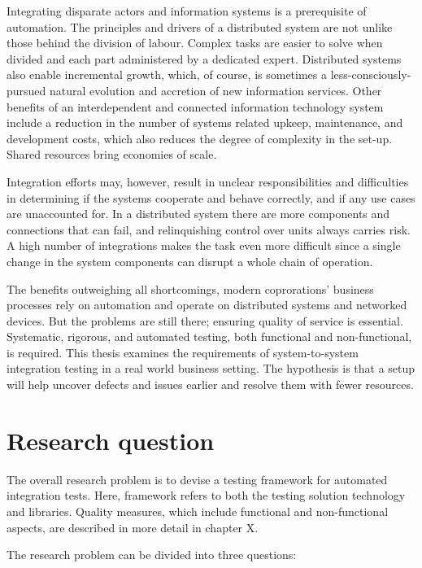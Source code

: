\documentclass[12pt,a4paper,oneside,pdftex]{report}
\begin{document}
Integrating disparate actors and information systems is a prerequisite of automation. The principles and drivers of  a distributed system are not unlike those behind the division of labour. Complex tasks are easier to solve when divided and each part administered by a dedicated expert. Distributed systems also enable incremental growth, which, of course, is sometimes a less-consciously-pursued natural evolution and accretion of new information services. Other benefits of an interdependent and connected information technology system include a reduction in the number of systems related upkeep, maintenance, and development costs, which also reduces the degree of complexity in the set-up. Shared resources bring economies of scale.

Integration efforts may, however, result in unclear responsibilities and difficulties in determining if the systems cooperate and behave correctly, and if any use cases are unaccounted for. In a distributed system there are more components and connections that can fail, and relinquishing control over units always carries risk. A high number of integrations makes the task even more difficult since a single change in the system components can disrupt a whole chain of operation.

The benefits outweighing all shortcomings, modern coprorations' business processes rely on automation and operate on distributed systems and networked devices. But the problems are still there; ensuring quality of service is essential. Systematic, rigorous, and automated testing, both functional and non-functional, is required. This thesis examines the requirements of system-to-system integration testing in a real world business setting. The hypothesis is that a setup will help uncover defects and issues earlier and resolve them with fewer resources.

\section{Research question}

The overall research problem is to devise a testing framework for automated integration tests. Here, framework refers to both the testing solution technology and libraries. Quality measures, which include functional and non-functional aspects, are described in more detail in chapter X. %

The research problem can be divided into three questions: \\
\end{document}
